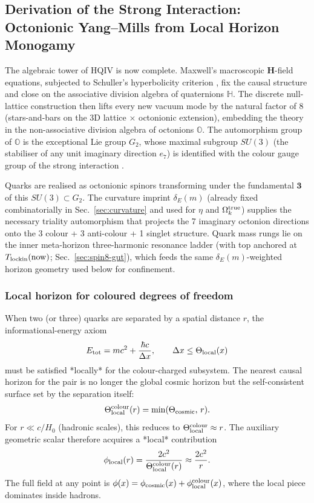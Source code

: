 \documentclass[12pt,a4paper]{article}
\begin{document}
\subsection{Derivation of the Strong Interaction: Octonionic Yang--Mills from Local Horizon Monogamy}
\label{sec:strong-sector}

The algebraic tower of HQIV is now complete. Maxwell's macroscopic $\mathbf{H}$-field equations, subjected to Schuller's hyperbolicity criterion \citep{Schuller2020}, fix the causal structure and close on the associative division algebra of quaternions $\mathbb{H}$. The discrete null-lattice construction then lifts every new vacuum mode by the natural factor of 8 (stars-and-bars on the 3D lattice $\times$ octonionic extension), embedding the theory in the non-associative division algebra of octonions $\mathbb{O}$. The automorphism group of $\mathbb{O}$ is the exceptional Lie group $G_2$, whose maximal subgroup $SU(3)$ (the stabiliser of any unit imaginary direction $e_7$) is identified with the colour gauge group of the strong interaction \citep{Gunaydin1974,Gunaydin1975,Okubo1978,Dixon1994,Toppan2021}.

Quarks are realised as octonionic spinors transforming under the fundamental $\mathbf{3}$ of this $SU(3)\subset G_2$. The curvature imprint $\delta_E(m)$ (already fixed combinatorially in Sec.~\ref{sec:curvature} and used for $\eta$ and $\Omega_k^{\rm true}$) supplies the necessary triality automorphism that projects the 7 imaginary octonion directions onto the 3 colour + 3 anti-colour + 1 singlet structure.
Quark mass rungs lie on the inner meta-horizon three-harmonic resonance ladder (with top anchored at $T_{\rm lockin}(\mathrm{now})$; Sec.~\ref{sec:spin8-gut}), which feeds the same $\delta_E(m)$-weighted horizon geometry used below for confinement.

\subsubsection{Local horizon for coloured degrees of freedom}
When two (or three) quarks are separated by a spatial distance $r$, the informational-energy axiom
\[
E_{\rm tot} = m c^2 + \frac{\hbar c}{\Delta x}, \qquad \Delta x \le \Theta_{\rm local}(x)
\]
must be satisfied *locally* for the colour-charged subsystem. The nearest causal horizon for the pair is no longer the global cosmic horizon but the self-consistent surface set by the separation itself:
\[
\Theta_{\rm local}^{\rm colour}(r) = \min(\Theta_{\rm cosmic},\, r).
\]
For $r \ll c/H_0$ (hadronic scales), this reduces to $\Theta_{\rm local}^{\rm colour} \approx r$. The auxiliary geometric scalar therefore acquires a *local* contribution
\[
\phi_{\rm local}(r) = \frac{2c^2}{\Theta_{\rm local}^{\rm colour}(r)} \approx \frac{2c^2}{r}.
\]
The full field at any point is $\phi(x) = \phi_{\rm cosmic}(x) + \phi_{\rm local}^{\rm colour}(x)$, where the local piece dominates inside hadrons.
\end{document}

